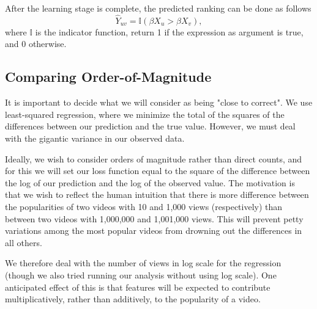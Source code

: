 After the learning stage is complete, the predicted ranking can be done as follows
\begin{equation}
\hat{Y}_{uv} = \mathbb{I}(\beta X_u > \beta X_v),
\end{equation}
where $\mathbb{I}$ is the indicator function, return 1 if the expression as argument is true, and 0 otherwise.

\subsection{Comparing Order-of-Magnitude}
\label{sec:orderofmagnitude}
	It is important to decide what we will consider as being "close to correct".  We use least-squared regression, where we minimize the total of the squares of the differences between our prediction and the true value.  However, we must deal with the gigantic variance in our observed data.

	Ideally, we wish to consider orders of magnitude rather than direct counts, and for this we will set our loss function equal to the square of the difference between the log of our prediction and the log of the observed value.  The motivation is that we wish to reflect the human intuition that there is more difference between the popularities of two videos with 10 and 1,000 views (respectively) than between two videos with 1,000,000 and 1,001,000 views.  This will prevent petty variations among the most popular videos from drowning out the differences in all others.

	We therefore deal with the number of views in log scale for the regression (though we also tried running our analysis without using log scale).  One anticipated effect of this is that features will be expected to contribute multiplicatively, rather than additively, to the popularity of a video.
